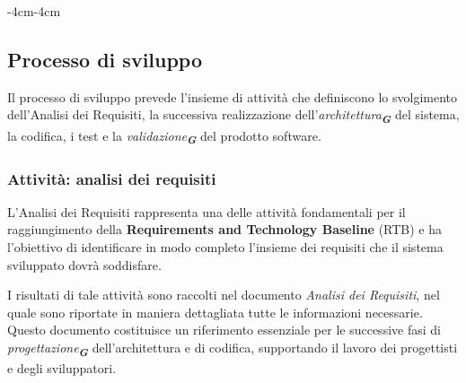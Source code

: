 \documentclass[a4paper,12pt]{article}
\newcommand{\glossario}[1]{\textit{#1}\textsubscript{\textbf{\textit{\textcolor{lightblack}{G}}}}}
\begin{document}
\begin{table}[H]
\begin{adjustwidth}{-4cm}{-4cm}
    \end{adjustwidth}
\end{table}

\subsection{Processo di sviluppo}
Il processo di sviluppo prevede l'insieme di attività che definiscono lo
svolgimento dell'Analisi dei Requisiti, la successiva realizzazione
dell'\glossario{architettura} del sistema, la codifica, i test e la \glossario{validazione}
del prodotto software.
\subsubsection{Attività: analisi dei requisiti}
L'Analisi dei Requisiti rappresenta una delle attività fondamentali
per il raggiungimento della \textbf{Requirements and Technology Baseline} (RTB) e ha
l'obiettivo di identificare in modo completo l'insieme dei requisiti che il
sistema sviluppato dovrà soddisfare.

I risultati di tale attività sono raccolti nel documento \textit{Analisi dei
    Requisiti}, nel quale sono riportate in maniera dettagliata tutte le
informazioni necessarie. Questo documento costituisce un riferimento essenziale
per le successive fasi di \glossario{progettazione} dell'architettura e di codifica,
supportando il lavoro dei progettisti e degli sviluppatori.
\end{document}
